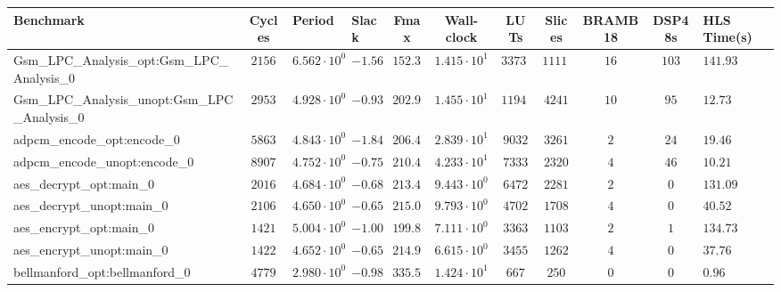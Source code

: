 \begin{tabular}{|l|c|HHc|c|c|c|c|cH|}
\hline
Benchmark                                       & Cycles       & Period                 & Slack     & Fmax       & Wall-clock              & LUTs       & Slices    & BRAMB18 & DSP48s  & HLS Time(s) \\
\hline
Gsm\_LPC\_Analysis\_opt:Gsm\_LPC\_Analysis\_0   & $ 2156     $ & $ 6.562 \cdot 10^{0} $ & $ -1.56 $ & $ 152.39 $ & $ 1.415 \cdot 10^{1}  $ & $ 33733  $ & $ 11116 $ & $ 16  $ & $ 103 $ & $ 141.93  $ \\
Gsm\_LPC\_Analysis\_unopt:Gsm\_LPC\_Analysis\_0 & $ 2953     $ & $ 4.928 \cdot 10^{0} $ & $ -0.93 $ & $ 202.92 $ & $ 1.455 \cdot 10^{1}  $ & $ 11947  $ & $ 4241  $ & $ 10  $ & $ 95  $ & $ 12.73   $ \\
adpcm\_encode\_opt:encode\_0                    & $ 5863     $ & $ 4.843 \cdot 10^{0} $ & $ -1.84 $ & $ 206.48 $ & $ 2.839 \cdot 10^{1}  $ & $ 9032   $ & $ 3261  $ & $ 2   $ & $ 24  $ & $ 19.46   $ \\
adpcm\_encode\_unopt:encode\_0                  & $ 8907     $ & $ 4.752 \cdot 10^{0} $ & $ -0.75 $ & $ 210.44 $ & $ 4.233 \cdot 10^{1}  $ & $ 7333   $ & $ 2320  $ & $ 4   $ & $ 46  $ & $ 10.21   $ \\
aes\_decrypt\_opt:main\_0                       & $ 2016     $ & $ 4.684 \cdot 10^{0} $ & $ -0.68 $ & $ 213.49 $ & $ 9.443 \cdot 10^{0}  $ & $ 6472   $ & $ 2281  $ & $ 2   $ & $ 0   $ & $ 131.09  $ \\
aes\_decrypt\_unopt:main\_0                     & $ 2106     $ & $ 4.650 \cdot 10^{0} $ & $ -0.65 $ & $ 215.05 $ & $ 9.793 \cdot 10^{0}  $ & $ 4702   $ & $ 1708  $ & $ 4   $ & $ 0   $ & $ 40.52   $ \\
aes\_encrypt\_opt:main\_0                       & $ 1421     $ & $ 5.004 \cdot 10^{0} $ & $ -1.00 $ & $ 199.84 $ & $ 7.111 \cdot 10^{0}  $ & $ 3363   $ & $ 1103  $ & $ 2   $ & $ 1   $ & $ 134.73  $ \\
aes\_encrypt\_unopt:main\_0                     & $ 1422     $ & $ 4.652 \cdot 10^{0} $ & $ -0.65 $ & $ 214.96 $ & $ 6.615 \cdot 10^{0}  $ & $ 3455   $ & $ 1262  $ & $ 4   $ & $ 0   $ & $ 37.76   $ \\
bellmanford\_opt:bellmanford\_0                 & $ 4779     $ & $ 2.980 \cdot 10^{0} $ & $ -0.98 $ & $ 335.57 $ & $ 1.424 \cdot 10^{1}  $ & $ 667    $ & $ 250   $ & $ 0   $ & $ 0   $ & $ 0.96    $ \\

\end{tabular}
